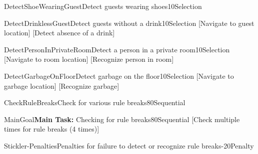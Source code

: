 
\begin{Group}{DetectShoeWearingGuest}{Detect guests wearing shoes}{10}{Selection}
\end{Group}

\begin{Group}{DetectDrinklessGuest}{Detect guests without a drink}{10}{Selection}
    [Navigate to guest location]
    [Detect absence of a drink]
\end{Group}

\begin{Group}{DetectPersonInPrivateRoom}{Detect a person in a private room}{10}{Selection}
    [Navigate to room location]
    [Recognize person in room]
\end{Group}

\begin{Group}{DetectGarbageOnFloor}{Detect garbage on the floor}{10}{Selection}
    [Navigate to garbage location]
    [Recognize garbage]
\end{Group}

\begin{Group}{CheckRuleBreaks}{Check for various rule breaks}{80}{Sequential}
\end{Group}

\begin{Group}{MainGoal}{\textbf{\textcolor{myturquoise}{Main Task:}} Checking for rule breaks}{80}{Sequential}
    [Check multiple times for rule breaks (4 times)]
\end{Group}

\begin{Group}{Stickler-Penalties}{Penalties for failure to detect or recognize rule breaks}{-20}{Penalty}
\end{Group}
